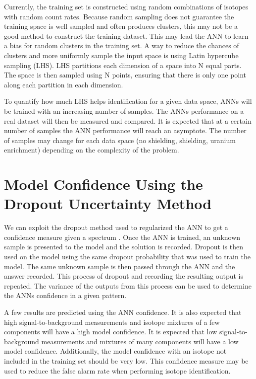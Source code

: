 \documentclass[thesis,tocnosub,noragright,centerchapter,12pt,fullpage]{uiucecethesis09}
\begin{document}
Currently, the training set is constructed using random combinations of isotopes with random count rates. Because random sampling does not guarantee the training space is well sampled and often produces clusters, this may not be a good method to construct the training dataset. This may lead the ANN to learn a bias for random clusters in the training set. A way to reduce the chances of clusters and more uniformly sample the input space is using Latin hypercube sampling (LHS). LHS partitions each dimension of a space into N equal parts. The space is then sampled using N points, ensuring that there is only one point along each partition in each dimension.


To quantify how much LHS helps identification for a given data space, ANNs will be trained with an increasing number of samples. The ANNs performance on a real dataset will then be measured and compared. It is expected that at a certain number of samples the ANN performance will reach an asymptote. The number of samples may change for each data space (no shielding, shielding, uranium enrichment) depending on the complexity of the problem.



\section{Model Confidence Using the Dropout Uncertainty Method}

We can exploit the dropout method used to regularized the ANN to get a confidence measure given a spectrum \cite{Yarin2016}. Once the ANN is trained, an unknown sample is presented to the model and the solution is recorded. Dropout is then used on the model using the same dropout probability that was used to train the model. The same unknown sample is then passed through the ANN and the answer recorded. This process of dropout and recording the resulting output is repeated. The variance of the outputs from this process can be used to determine the ANNs confidence in a given pattern. 

A few results are predicted using the ANN confidence. It is also expected that high signal-to-background measurements and isotope mixtures of a few components will have a high model confidence. It is expected that low signal-to-background measurements and mixtures of many components will have a low model confidence. Additionally, the model confidence with an isotope not included in the training set should be very low. This confidence measure may be used to reduce the false alarm rate when performing isotope identification. 
\end{document}
